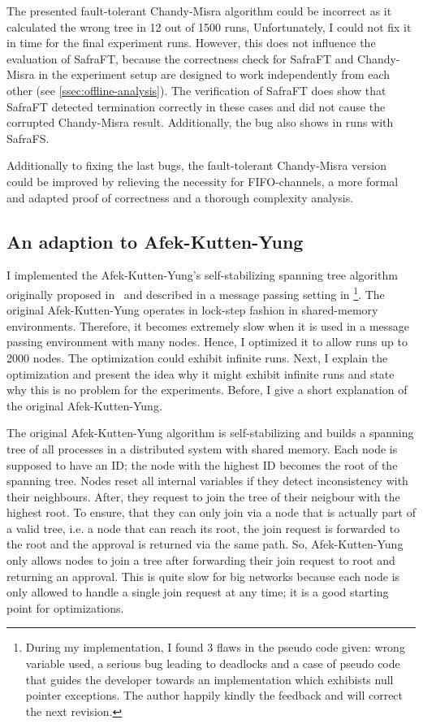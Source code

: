The presented fault-tolerant Chandy-Misra algorithm could be incorrect as it calculated the wrong tree in 12 out of 1500 runs,
Unfortunately, I could not fix it in time for the final experiment runs.
However, this does not influence the evaluation of SafraFT, because the correctness check for SafraFT and Chandy-Misra in the experiment setup are designed to work independently from each other (see \cref{ssec:offline-analysis}).
The verification of SafraFT does show that SafraFT detected termination correctly in these cases and did not cause the corrupted Chandy-Misra result.
Additionally, the bug also shows in runs with SafraFS.

Additionally to fixing the last bugs, the fault-tolerant Chandy-Misra version could be improved by relieving the necessity for FIFO-channels, a more formal and adapted proof of correctness and a thorough complexity analysis.

\subsection{An adaption to Afek-Kutten-Yung}
I implemented the Afek-Kutten-Yung's self-stabilizing spanning tree algorithm originally proposed in~\cite{afek} and  described in a message passing setting in \cite[page 183ff]{fokkink:2018}\footnote{During my implementation, I found 3 flaws in the pseudo code given: wrong variable used, a serious bug leading to deadlocks and a case of pseudo code that guides the developer towards an implementation which exhibists null pointer exceptions. The author happily kindly the feedback and will correct the next revision.}.
The original Afek-Kutten-Yung operates in lock-step fashion in shared-memory environments.
Therefore, it becomes extremely slow when it is used in a message passing environment with many nodes.
Hence, I optimized it to allow runs up to 2000 nodes.
The optimization could exhibit infinite runs.
Next, I explain the optimization and present the idea why it might exhibit infinite runs and state why this is no problem for the experiments. Before, I give a short explanation of the original Afek-Kutten-Yung.

The original Afek-Kutten-Yung algorithm is self-stabilizing and builds a spanning tree of all processes in a distributed system with shared memory. 
Each node is supposed to have an ID; the node with the highest ID becomes the root of the spanning tree.
Nodes reset all internal variables if they detect inconsistency with their neighbours.
After, they request to join the tree of their neigbour with the highest root.
To ensure, that they can only join via a node that is actually part of a valid tree, i.e. a node that can reach its root, the join request is forwarded to the root and the approval is returned via the same path.
So, Afek-Kutten-Yung only allows nodes to join a tree after forwarding their join request to root and returning an approval.
This is quite slow for big networks because each node is only allowed to handle a single join request at any time; 
it is a good starting point for optimizations.

